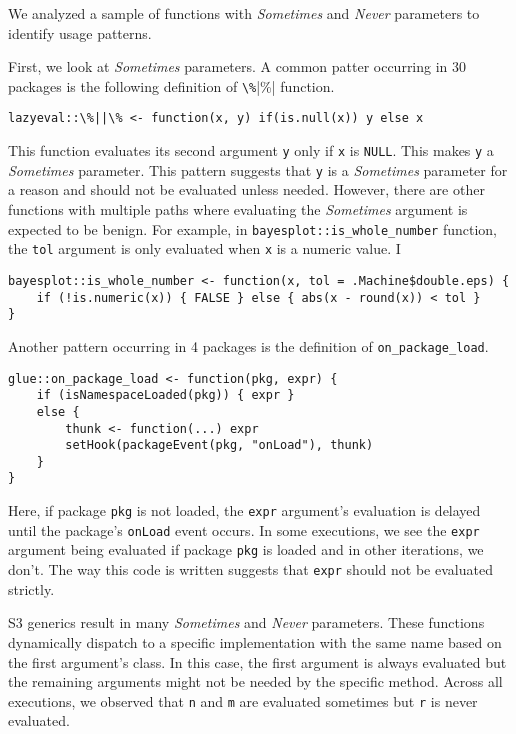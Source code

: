 \documentclass[review,nonacm,screen,acmsmall,anonymous=true]{acmart}
\newcommand{\sometimes}{\emph{Sometimes}\xspace}
\newcommand{\never}{\emph{Never}\xspace}
\newcommand{\code}[1]{\lstinline[style=R]|#1|\xspace}
\begin{document}
We analyzed a sample of functions with \sometimes and \never parameters to
identify usage patterns.

First, we look at \sometimes parameters. A common patter occurring in 30
packages is the following definition of \code{\%||\%} function.

\begin{lstlisting}
lazyeval::\%||\% <- function(x, y) if(is.null(x)) y else x
\end{lstlisting}

This function evaluates its second argument \code{y} only if \code{x} is
\code{NULL}. This makes \code{y} a \sometimes parameter. This pattern suggests
that \code{y} is a \sometimes parameter for a reason and should not be evaluated
unless needed. However, there are other functions with multiple paths where
evaluating the \sometimes argument is expected to be benign. For example, in
\code{bayesplot::is_whole_number} function, the \code{tol} argument is only
evaluated when \code{x} is a numeric value. I

\begin{lstlisting}
bayesplot::is_whole_number <- function(x, tol = .Machine$double.eps) {
    if (!is.numeric(x)) { FALSE } else { abs(x - round(x)) < tol }
}
\end{lstlisting}


Another pattern occurring in 4 packages is the definition of
\code{on_package_load}.

\begin{lstlisting}
glue::on_package_load <- function(pkg, expr) {
    if (isNamespaceLoaded(pkg)) { expr }
    else {
        thunk <- function(...) expr
        setHook(packageEvent(pkg, "onLoad"), thunk)
    }
}
\end{lstlisting}

Here, if package \code{pkg} is not loaded, the \code{expr} argument's evaluation
is delayed until the package's \code{onLoad} event occurs. In some executions,
we see the \code{expr} argument being evaluated if package \code{pkg} is loaded
and in other iterations, we don't. The way this code is written suggests that
\code{expr} should not be evaluated strictly.

S3 generics result in many \sometimes and \never parameters. These functions
dynamically dispatch to a specific implementation with the same name based on
the first argument's class. In this case, the first argument is always evaluated
but the remaining arguments might not be needed by the specific method. Across
all executions, we observed that \code{n} and \code{m} are evaluated sometimes
but \code{r} is never evaluated.
\end{document}
